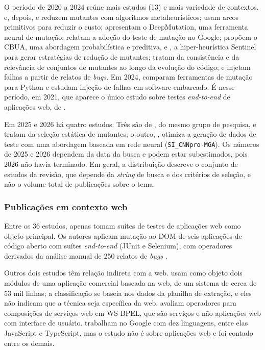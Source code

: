 O período de 2020 a 2024 reúne mais estudos (13) e mais variedade de contextos.  e, depois,  e  reduzem mutantes com algoritmos metaheurísticos;  usam arcos primitivos para reduzir o custo;  apresentam o DeepMutation, uma ferramenta neural de mutação;  relatam a adoção do teste de mutação no Google;  propõem o CBUA, uma abordagem probabilística e preditiva, e , a hiper-heurística Sentinel para gerar estratégias de redução de mutantes;  tratam da consistência e da relevância de conjuntos de mutantes ao longo da evolução do código; e  injetam falhas a partir de relatos de \textit{bugs}. Em 2024,  comparam ferramentas de mutação para Python e  estudam injeção de falhas em software embarcado. É nesse período, em 2021, que aparece o único estudo sobre testes \textit{end-to-end} de aplicações web, de .

Em 2025 e 2026 há quatro estudos. Três são de , do mesmo grupo de pesquisa, e tratam da seleção estática de mutantes; o outro, , otimiza a geração de dados de teste com uma abordagem baseada em rede neural (\texttt{SI\_CNNpro-MGA}). Os números de 2025 e 2026 dependem da data da busca e podem estar subestimados, pois 2026 não havia terminado. Em geral, a distribuição descreve o conjunto de estudos da revisão, que depende da \textit{string} de busca e dos critérios de seleção, e não o volume total de publicações sobre o tema.

\subsubsection{Publicações em contexto web}
\label{subsubsec:publicacoes-web}

Entre os 36 estudos, apenas  tomam suítes de testes de aplicações web como objeto principal. Os autores aplicam mutação ao DOM de seis aplicações de código aberto com suítes \textit{end-to-end} (JUnit e Selenium), com operadores derivados da análise manual de 250 relatos de \textit{bugs} \cite{yandrapally2021}.

Outros dois estudos têm relação indireta com a web.  usam como objeto dois módulos de uma aplicação comercial baseada na web, de um sistema de cerca de 53 mil linhas; a classificação se baseia nos dados da planilha de extração, e eles não indicam que a técnica seja específica da web.  avaliam operadores para composições de serviços web em WS-BPEL, que são serviços e não aplicações web com interface de usuário.  trabalham no Google com dez linguagens, entre elas JavaScript e TypeScript, mas o estudo não é sobre aplicações web e foi contado entre os demais.

